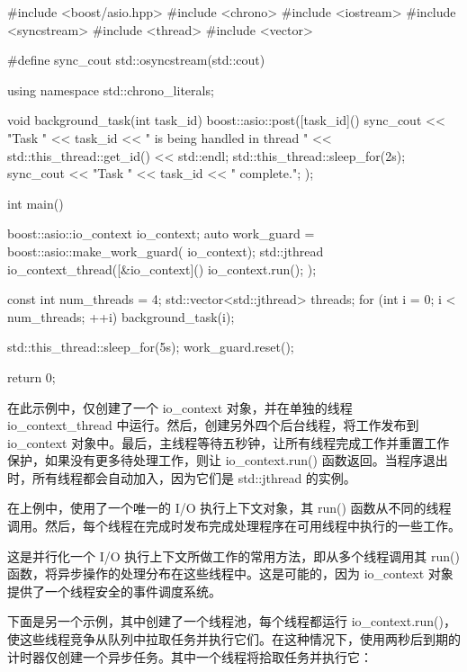\begin{cpp}
#include <boost/asio.hpp>
#include <chrono>
#include <iostream>
#include <syncstream>
#include <thread>
#include <vector>

#define sync_cout std::osyncstream(std::cout)

using namespace std::chrono_literals;

void background_task(int task_id) {
    boost::asio::post([task_id]() {
        sync_cout << "Task " << task_id
                  << " is being handled in thread "
                  << std::this_thread::get_id()
                  << std::endl;
        std::this_thread::sleep_for(2s);
        sync_cout << "Task " << task_id
        << " complete.\n";
    });
}

int main() {
    boost::asio::io_context io_context;
    auto work_guard = boost::asio::make_work_guard(
                                    io_context);
    std::jthread io_context_thread([&io_context]() {
        io_context.run();
    });

    const int num_threads = 4;
    std::vector<std::jthread> threads;
    for (int i = 0; i < num_threads; ++i) {
        background_task(i);
    }

    std::this_thread::sleep_for(5s);
    work_guard.reset();

    return 0;
}
\end{cpp}

在此示例中，仅创建了一个 io\_context 对象，并在单独的线程 io\_context\_thread 中运行。然后，创建另外四个后台线程，将工作发布到 io\_context 对象中。最后，主线程等待五秒钟，让所有线程完成工作并重置工作保护，如果没有更多待处理工作，则让 io\_context.run() 函数返回。当程序退出时，所有线程都会自动加入，因为它们是 std::jthread 的实例。


在上例中，使用了一个唯一的 I/O 执行上下文对象，其 run() 函数从不同的线程调用。然后，每个线程在完成时发布完成处理程序在可用线程中执行的一些工作。

这是并行化一个 I/O 执行上下文所做工作的常用方法，即从多个线程调用其 run() 函数，将异步操作的处理分布在这些线程中。这是可能的，因为 io\_context 对象提供了一个线程安全的事件调度系统。

下面是另一个示例，其中创建了一个线程池，每个线程都运行 io\_context.run()，使这些线程竞争从队列中拉取任务并执行它们。在这种情况下，使用两秒后到期的计时器仅创建一个异步任务。其中一个线程将拾取任务并执行它：

